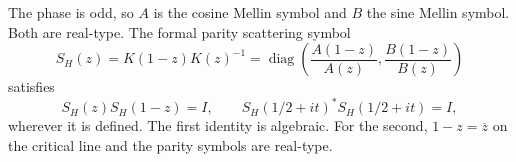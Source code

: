 The phase is odd, so $A$ is the cosine Mellin symbol and $B$ the sine Mellin
symbol. Both are real-type. The formal parity scattering symbol
\begin{equation}\label{eq:SH}
S_H(z)=K(1-z)K(z)^{-1}
=\operatorname{diag}\left(\frac{A(1-z)}{A(z)},
\frac{B(1-z)}{B(z)}\right)
\end{equation}
satisfies
\begin{equation}\label{eq:symmetries}
S_H(z)S_H(1-z)=I,
\qquad
S_H(1/2+it)^*S_H(1/2+it)=I,
\end{equation}
wherever it is defined. The first identity is algebraic. For the second,
$1-z=\overline z$ on the critical line and the parity symbols are real-type.
